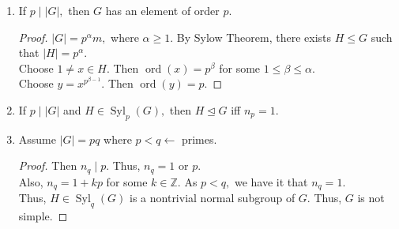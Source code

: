 \documentclass[12 pt, a4paper, toc=graduated, oneside]{article}
\theoremstyle{definition}
\newcommand{\Syl}{\operatorname{Syl}}
\newcommand{\ord}{\operatorname{ord}}
\begin{document}
\begin{enumerate} 
	\item If $p \mid |G|,$ then $G$ has an element of order $p.$
	\begin{proof}
		$|G| = p^\alpha m,$ where $\alpha \ge 1.$
		By Sylow Theorem, there exists $H \le G$ such that $|H| = p^\alpha.$\\
		Choose $1 \neq x \in H.$ Then $\ord(x) = p^\beta$ for some $1 \le \beta \le \alpha.$\\
		Choose $y = x^{p^{\beta - 1}}.$ Then $\ord(y) = p.$
	\end{proof}
	\item If $p \mid |G|$ and $H \in \Syl_p(G),$ then $H \trianglelefteq G$ iff $n_p = 1.$
	\item Assume $|G| = pq$ where $p < q \longleftarrow$ primes.\\
	\begin{proof}
	Then $n_q \mid p.$ Thus, $n_q = 1$ or $p.$\\
	Also, $n_q = 1 + kp$ for some $k \in \mathbb{Z}.$ As $p < q,$ we have it that $n_q = 1.$\\
	Thus, $H \in \Syl_q(G)$ is a nontrivial normal subgroup of $G.$ Thus, $G$ is not simple.
	\end{proof}
	

\end{enumerate}
\end{document}
